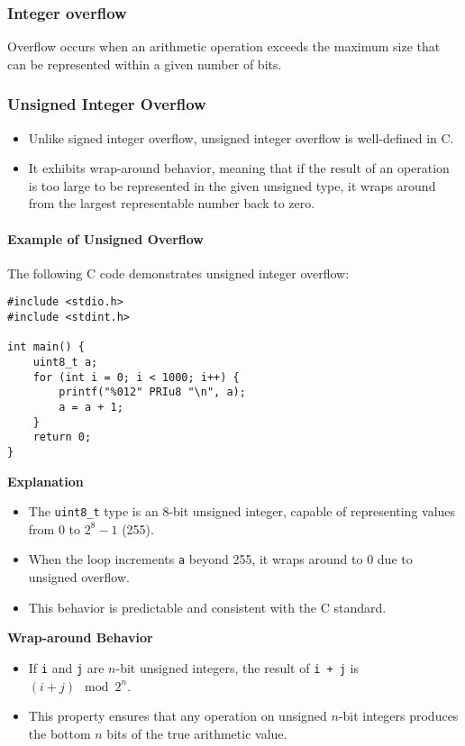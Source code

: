 \documentclass[12pt]{article}
\begin{document}
\subsubsection{Integer overflow}
Overflow occurs when an arithmetic operation exceeds the maximum size that can be represented within a given number of bits.

\subsubsection{Unsigned Integer Overflow}

\begin{itemize}
    \item Unlike signed integer overflow, unsigned integer overflow is well-defined in C.
    \item It exhibits wrap-around behavior, meaning that if the result of an operation is too large to be represented in the given unsigned type, it wraps around from the largest representable number back to zero.
\end{itemize}

\paragraph{Example of Unsigned Overflow}

The following C code demonstrates unsigned integer overflow:

\begin{verbatim}
#include <stdio.h>
#include <stdint.h>

int main() {
    uint8_t a;
    for (int i = 0; i < 1000; i++) {
        printf("%012" PRIu8 "\n", a);
        a = a + 1;
    }
    return 0;
}
\end{verbatim}

\textbf{Explanation}
\begin{itemize}
    \item The \texttt{uint8\_t} type is an 8-bit unsigned integer, capable of representing values from 0 to \(2^8 - 1\) (255).
    \item When the loop increments \texttt{a} beyond 255, it wraps around to 0 due to unsigned overflow.
    \item This behavior is predictable and consistent with the C standard.
\end{itemize}

\textbf{Wrap-around Behavior}

\begin{itemize}
    \item If \texttt{i} and \texttt{j} are \(n\)-bit unsigned integers, the result of \texttt{i + j} is \((i + j) \mod 2^n\).
    \item This property ensures that any operation on unsigned \(n\)-bit integers produces the bottom \(n\) bits of the true arithmetic value.
\end{itemize}
\end{document}
